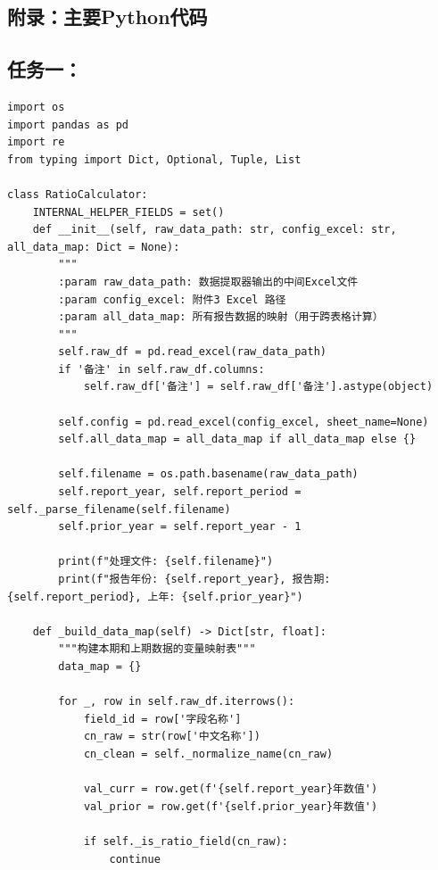 \documentclass[withoutpreface,bwprint]{cumcmthesis} %
\begin{document}
\newpage
\begin{appendices}

	\newpage
	\section{附录：主要Python代码}

	\subsection{任务一：}
	\label{code:prob1}

	\begin{lstlisting}[caption={数据公式计算模块部分代码}, label={lst:code1}]
	import os
import pandas as pd
import re
from typing import Dict, Optional, Tuple, List

class RatioCalculator:
    INTERNAL_HELPER_FIELDS = set()
    def __init__(self, raw_data_path: str, config_excel: str, all_data_map: Dict = None):
        """
        :param raw_data_path: 数据提取器输出的中间Excel文件
        :param config_excel: 附件3 Excel 路径
        :param all_data_map: 所有报告数据的映射（用于跨表格计算）
        """
        self.raw_df = pd.read_excel(raw_data_path)
        if '备注' in self.raw_df.columns:
            self.raw_df['备注'] = self.raw_df['备注'].astype(object)

        self.config = pd.read_excel(config_excel, sheet_name=None)
        self.all_data_map = all_data_map if all_data_map else {}
        
        self.filename = os.path.basename(raw_data_path)
        self.report_year, self.report_period = self._parse_filename(self.filename)
        self.prior_year = self.report_year - 1

        print(f"处理文件: {self.filename}")
        print(f"报告年份: {self.report_year}, 报告期: {self.report_period}, 上年: {self.prior_year}")

    def _build_data_map(self) -> Dict[str, float]:
        """构建本期和上期数据的变量映射表"""
        data_map = {}
        
        for _, row in self.raw_df.iterrows():
            field_id = row['字段名称']
            cn_raw = str(row['中文名称'])
            cn_clean = self._normalize_name(cn_raw)

            val_curr = row.get(f'{self.report_year}年数值')
            val_prior = row.get(f'{self.prior_year}年数值')

            if self._is_ratio_field(cn_raw):
                continue


\end{lstlisting}
\end{appendices}
\end{document}
